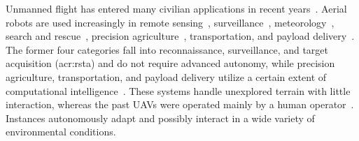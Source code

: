 Unmanned flight has entered many civilian applications in recent years~\citep{gonzalez2017unmanned}. Aerial robots are used increasingly in remote sensing~\citep{colomina2014unmanned,noor2018remote,tang2015drone,milas2018drones}, surveillance~\citep{acevedo2014one,ramasamy2017heuristic,basilico2015deploying,paucar2018use,burkle2009collaborating}, meteorology~\citep{renzaglia2016monitoring,schuyler2019using}, search and rescue~\citep{hayat2017multi,pensieri2020drones,karaca2018potential,cui2015drones,seguin2018unmanned}, precision agriculture~\citep{popovic2017online,sa2018weednet,lottes2017uav,daponte2019review,puri2017agriculture}, transportation, and payload delivery~\citep{kellermann2020drones}. The former four categories fall into reconnaissance, surveillance, and target acquisition (\Gls{acr:rsta}) and do not require advanced autonomy, while precision agriculture, transportation, and payload delivery utilize a certain extent of computational intelligence~\citep{siciliano2016springer}. These systems handle unexplored terrain with little interaction, whereas the past UAVs were operated mainly by a human operator~\citep{siciliano2016springer}. Instances autonomously adapt and possibly interact in a wide variety of environmental conditions.

